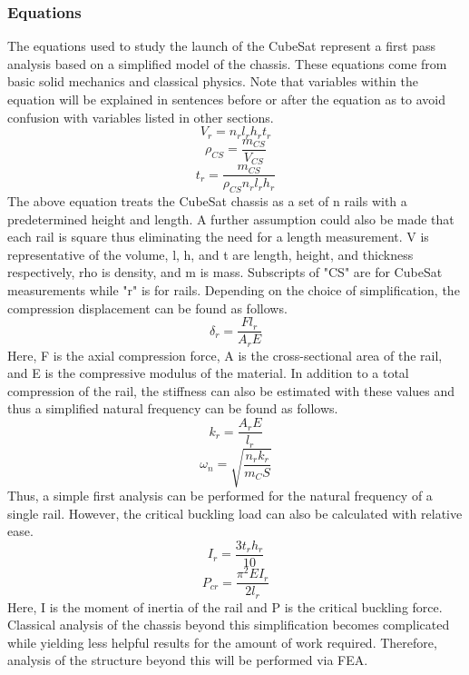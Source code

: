 \subsubsection{Equations}
The equations used to study the launch of the CubeSat represent a first pass analysis based on a simplified model of the chassis. These equations come from basic solid mechanics and classical physics. Note that variables within the equation will be explained in sentences before or after the equation as to avoid confusion with variables listed in other sections.
\begin{equation}
    \label{rail_V}
    V_r = n_rl_rh_rt_r
\end{equation}
\begin{equation}
    \label{CS_rho}
    \rho_{CS} =\frac{m_{CS}}{V_{CS}}
\end{equation}
\begin{equation}
    \label{rail_t}
    t_r = \frac{m_{CS}}{\rho_{CS}n_rl_rh_r}
\end{equation}
The above equation treats the CubeSat chassis as a set of n rails with a predetermined height and length. A further assumption could also be made that each rail is square thus eliminating the need for a length measurement. V is representative of the volume, l, h, and t are length, height, and thickness respectively, rho is density, and m is mass. Subscripts of "CS" are for CubeSat measurements while "r" is for rails. Depending on the choice of simplification, the compression displacement can be found as follows.
\begin{equation}
    \label{rail_I}
    \delta_r = \frac{Fl_r}{A_rE}
\end{equation}
Here, F is the axial compression force, A is the cross-sectional area of the rail, and E is the compressive modulus of the material. In addition to a total compression of the rail, the stiffness can also be estimated with these values and thus a simplified natural frequency can be found as follows.
\begin{equation}
    \label{rail_k}
    k_r = \frac{A_rE}{l_r}
\end{equation}
\begin{equation}
    \label{natf}
    \omega_n = \sqrt{\frac{n_rk_r}{m_CS}}
\end{equation}
Thus, a simple first analysis can be performed for the natural frequency of a single rail. However, the critical buckling load can also be calculated with relative ease.
\begin{equation}
    \label{I_r}
    I_r = \frac{3t_rh_r}{10}
\end{equation}
\begin{equation}
    \label{P_cr}
    P_{cr} = \frac{\pi^2EI_r}{2l_r}
\end{equation}
Here, I is the moment of inertia of the rail and P is the critical buckling force. Classical analysis of the chassis beyond this simplification becomes complicated while yielding less helpful results for the amount of work required. Therefore, analysis of the structure beyond this will be performed via FEA.
